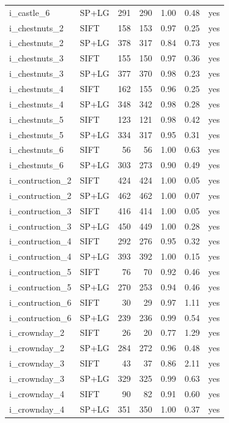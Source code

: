 \begin{longtable}{llrrrrr}
i\_castle\_6 & SP+LG & 291 & 290 & 1.00 & 0.48 & yes \\
i\_chestnuts\_2 & SIFT & 158 & 153 & 0.97 & 0.25 & yes \\
i\_chestnuts\_2 & SP+LG & 378 & 317 & 0.84 & 0.73 & yes \\
i\_chestnuts\_3 & SIFT & 155 & 150 & 0.97 & 0.36 & yes \\
i\_chestnuts\_3 & SP+LG & 377 & 370 & 0.98 & 0.23 & yes \\
i\_chestnuts\_4 & SIFT & 162 & 155 & 0.96 & 0.25 & yes \\
i\_chestnuts\_4 & SP+LG & 348 & 342 & 0.98 & 0.28 & yes \\
i\_chestnuts\_5 & SIFT & 123 & 121 & 0.98 & 0.42 & yes \\
i\_chestnuts\_5 & SP+LG & 334 & 317 & 0.95 & 0.31 & yes \\
i\_chestnuts\_6 & SIFT & 56 & 56 & 1.00 & 0.63 & yes \\
i\_chestnuts\_6 & SP+LG & 303 & 273 & 0.90 & 0.49 & yes \\
i\_contruction\_2 & SIFT & 424 & 424 & 1.00 & 0.05 & yes \\
i\_contruction\_2 & SP+LG & 462 & 462 & 1.00 & 0.07 & yes \\
i\_contruction\_3 & SIFT & 416 & 414 & 1.00 & 0.05 & yes \\
i\_contruction\_3 & SP+LG & 450 & 449 & 1.00 & 0.28 & yes \\
i\_contruction\_4 & SIFT & 292 & 276 & 0.95 & 0.32 & yes \\
i\_contruction\_4 & SP+LG & 393 & 392 & 1.00 & 0.15 & yes \\
i\_contruction\_5 & SIFT & 76 & 70 & 0.92 & 0.46 & yes \\
i\_contruction\_5 & SP+LG & 270 & 253 & 0.94 & 0.46 & yes \\
i\_contruction\_6 & SIFT & 30 & 29 & 0.97 & 1.11 & yes \\
i\_contruction\_6 & SP+LG & 239 & 236 & 0.99 & 0.54 & yes \\
i\_crownday\_2 & SIFT & 26 & 20 & 0.77 & 1.29 & yes \\
i\_crownday\_2 & SP+LG & 284 & 272 & 0.96 & 0.48 & yes \\
i\_crownday\_3 & SIFT & 43 & 37 & 0.86 & 2.11 & yes \\
i\_crownday\_3 & SP+LG & 329 & 325 & 0.99 & 0.63 & yes \\
i\_crownday\_4 & SIFT & 90 & 82 & 0.91 & 0.60 & yes \\
i\_crownday\_4 & SP+LG & 351 & 350 & 1.00 & 0.37 & yes \\

\end{longtable}
